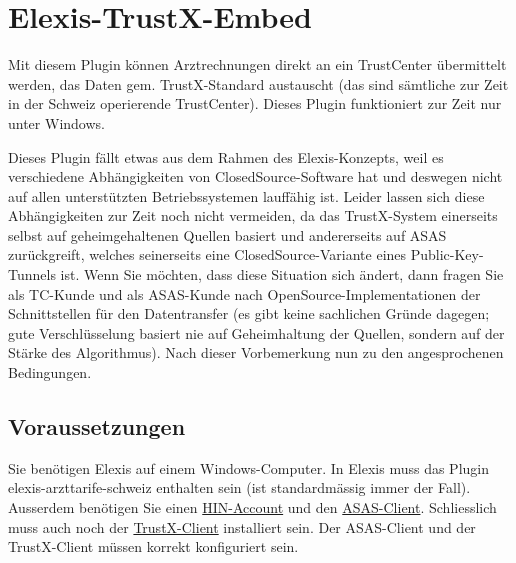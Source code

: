 
\section{Elexis-TrustX-Embed }
\label{trustx}
Mit diesem Plugin können Arztrechnungen direkt an ein TrustCenter übermittelt werden, das Daten gem. TrustX-Standard austauscht (das sind sämtliche zur Zeit in der Schweiz operierende TrustCenter). Dieses Plugin funktioniert zur Zeit nur unter Windows.

Dieses Plugin fällt etwas aus dem Rahmen des Elexis-Konzepts, weil es verschiedene Abhängigkeiten von ClosedSource-Software hat und deswegen nicht auf allen unterstützten Betriebssystemen lauffähig ist. Leider lassen sich diese Abhängigkeiten zur Zeit noch nicht vermeiden, da das TrustX-System einerseits selbst auf geheimgehaltenen Quellen basiert und andererseits auf ASAS zurückgreift, welches seinerseits eine ClosedSource-Variante eines Public-Key-Tunnels ist.
Wenn Sie möchten, dass diese Situation sich ändert, dann fragen Sie als TC-Kunde und als ASAS-Kunde nach OpenSource-Implementationen der Schnittstellen für den Datentransfer (es gibt keine sachlichen Gründe dagegen; gute Verschlüsselung basiert nie auf Geheimhaltung der Quellen, sondern auf der Stärke des Algorithmus).
Nach dieser Vorbemerkung nun zu den angesprochenen Bedingungen.

\subsection{Voraussetzungen}
Sie benötigen Elexis auf einem Windows-Computer. In Elexis muss das Plugin elexis-arzttarife-schweiz  enthalten sein (ist standardmässig immer der Fall). Ausserdem benötigen Sie einen \href{http://www.hin.ch}{HIN-Account} und den \href{http://www.hin.ch/asas}{ASAS-Client}. Schliesslich muss auch noch der \href{http://www.trustx.ch/trustx-praxis/documents/setup-2_1_14.exe}{TrustX-Client} installiert sein. Der ASAS-Client und der TrustX-Client müssen korrekt konfiguriert sein.

